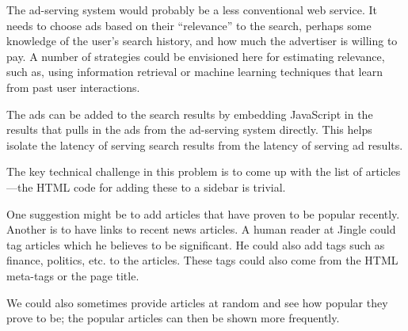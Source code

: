 The ad-serving system would probably be a less conventional web service.
It needs to choose
ads based on their ``relevance'' to the search, 
perhaps some knowledge of the user's search history, and how much the advertiser is
willing to pay. A number of strategies could be envisioned here for
estimating relevance, such
as, using information retrieval or  machine learning techniques that learn from past user interactions.


The ads can be added to the search results
by embedding JavaScript in the results that pulls in the ads from the
ad-serving system directly. This helps isolate the latency of serving search results from the latency of serving ad results.

The key technical challenge in this problem is to come up with the list of
articles---the HTML code for adding these to a sidebar is trivial.

One suggestion might be to add articles that have proven to be popular recently.
Another is to have links to recent news articles.  A human reader at Jingle 
could tag articles which he believes to be significant. He could 
also add tags such as finance, politics, etc. to the articles.
These tags could also come from the HTML meta-tags or the page title.

We could also sometimes provide articles at random and see how popular
they prove to be; the popular articles can then be shown more
frequently.

